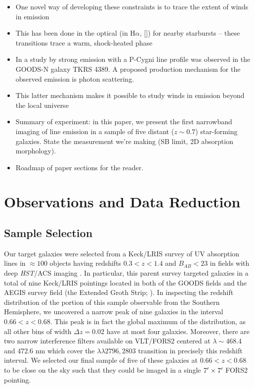 \documentclass[twocolumn]{aastex6}
\begin{document}
\begin{itemize}
\item One novel way of developing these constraints is to trace the extent of winds in emission

\item This has been done in the optical (in H$\alpha$, []) for nearby starbursts -- these transitions trace a warm, shock-heated phase

\item In a study by \cite{Rubin_2011} strong  emission with a P-Cygni line profile was observed in the GOODS-N galaxy TKRS 4389. A proposed production mechanism for the observed  emission is photon scattering.

\item This latter mechanism makes it possible to study winds in emission beyond the local universe

\item Summary of experiment: in this paper, we present the first narrowband imaging of  line emission in a sample of five distant ($z\sim0.7$) star-forming galaxies.  State the measurement we're making (SB limit, 2D absorption morphology).

\item Roadmap of paper sections for the reader.

\end{itemize}


\section{Observations and Data Reduction}

\subsection{Sample Selection}

Our target galaxies were selected from a Keck/LRIS survey of UV absorption lines in $\approx 100$ objects having redshifts $0.3< z < 1.4$ and $B_{AB}< 23$ in fields with deep \emph{HST}/ACS imaging \citep{Rubin_2014}.  In particular, this parent survey targeted galaxies in a total of nine Keck/LRIS pointings located in both of the GOODS fields \citep{Giavalisco2004} and the AEGIS survey field (the Extended Groth Strip; \cite{Davis2007}).  In inspecting the redshift distribution of the portion of this sample observable from the Southern Hemisphere, we uncovered a narrow peak of nine galaxies in the interval $0.66 < z < 0.68$.  This peak is in fact the global maximum of the distribution, as all other bins of width $\Delta z = 0.02$ have at most four galaxies.  Moreover, there are two narrow interference filters available on VLT/FORS2 centered at $\lambda \sim 468.4$ and 472.6 nm which cover the  $\lambda \lambda 2796, 2803$ transition in precisely this redshift interval.  We selected our final sample of five of these galaxies at $0.66 < z < 0.68$ to be close on the sky such that they could be imaged in a single $7\mbox{$^\prime$} \times 7\mbox{$^\prime$}$ FORS2 pointing.  
\end{document}
